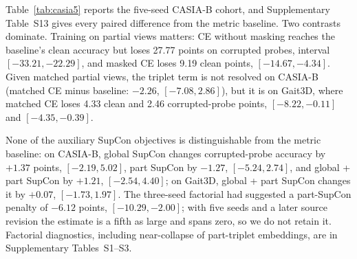 \documentclass[journal]{IEEEtran}
\begin{document}
Table~\ref{tab:casia5} reports the five-seed CASIA-B cohort, and
Supplementary Table~S13 gives every paired difference from the metric baseline. Two
contrasts dominate. Training on partial views matters: CE without masking
reaches the baseline's clean accuracy but loses 27.77 points on corrupted
probes, interval $[-33.21,-22.29]$, and masked CE loses 9.19 clean points,
$[-14.67,-4.34]$. Given matched partial views, the triplet term is not
resolved on CASIA-B (matched CE minus baseline: $-2.26$, $[-7.08,2.86]$), but it
is on Gait3D, where matched CE loses 4.33 clean and 2.46 corrupted-probe points,
$[-8.22,-0.11]$ and $[-4.35,-0.39]$.

None of the auxiliary SupCon objectives is distinguishable from the metric
baseline: on CASIA-B, global SupCon changes corrupted-probe accuracy by $+1.37$
points, $[-2.19,5.02]$, part SupCon by $-1.27$, $[-5.24,2.74]$, and global + part
SupCon by $+1.21$, $[-2.54,4.40]$; on Gait3D, global + part SupCon changes it by
$+0.07$, $[-1.73,1.97]$. The three-seed factorial had suggested a part-SupCon
penalty of $-6.12$ points, $[-10.29,-2.00]$; with five seeds and a later source
revision the estimate is a fifth as large and spans zero, so we do not retain it.
Factorial diagnostics, including near-collapse of part-triplet embeddings, are
in Supplementary Tables~S1--S3.
\end{document}
